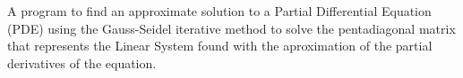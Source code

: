 A program to find an approximate solution to a Partial Differential Equation (P\+DE) using the Gauss-\/\+Seidel iterative method to solve the pentadiagonal matrix that represents the Linear System found with the aproximation of the partial derivatives of the equation. 